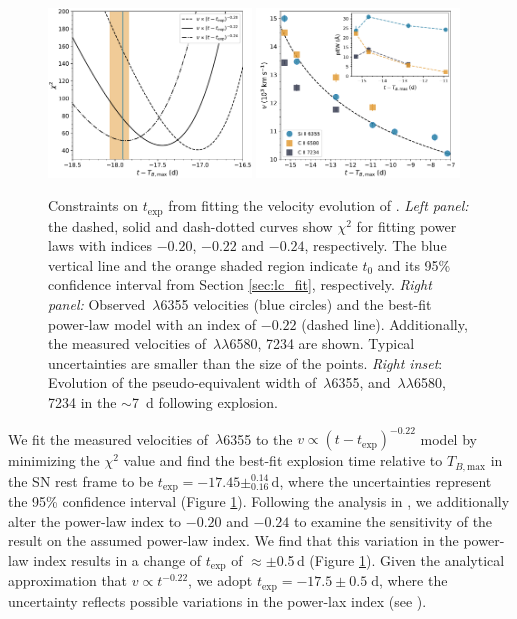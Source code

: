 \documentclass[twocolumn]{aastex61}
\begin{document}
\begin{figure}[!thb]
  \centering
  \includegraphics[width=0.48\textwidth]{Chi2.pdf}
  \includegraphics[width=0.48\textwidth]{VelocityPlot.pdf}
  \caption{Constraints on $t_\mathrm{exp}$ from fitting the velocity
    evolution of .
    \textit{Left panel:} the dashed, solid and dash-dotted curves 
    show $\chi^2$ for fitting power laws with
    indices $-0.20$, $-0.22$ and $-0.24$, respectively. The blue
    vertical line and the orange shaded region indicate $t_0$ and 
    its 95\% confidence interval from Section
    \ref{sec:lc_fit}, respectively.
    \textit{Right panel:} Observed \,$\lambda$6355
    velocities (blue circles) and the best-fit power-law model
     with an index of $-0.22$ (dashed line). Additionally, the 
     measured velocities of \,$\lambda\lambda$6580, 7234 
     are shown. Typical uncertainties are smaller than the size of 
     the points. \textit{Right inset}: Evolution of the 
     pseudo-equivalent width of \,$\lambda$6355, and 
     \,$\lambda\lambda$6580, 7234 in the $\sim$7~d    
     following explosion.}
  \label{fig:velocity_t_exp}
\end{figure}

We fit the measured velocities of \,$\lambda$6355 to the
$v\propto(t-t_\mathrm{exp})^{-0.22}$ model by minimizing the $\chi^2$ value and find the best-fit explosion time relative to $T_{B,\mathrm{max}}$ in the SN rest frame to be $t_\mathrm{exp} = -17.45 \pm ^{0.14}_{0.16}\,\textrm{d}$, where the uncertainties represent the 95\% confidence interval (Figure \ref{fig:velocity_t_exp}). Following the analysis in \citet{2014ApJ...784...85P}, we additionally alter the power-law index to $-0.20$ and $-0.24$ to examine the sensitivity of the result on the assumed power-law index. We find that this variation in the power-law index results in a change of $t_\mathrm{exp}$ of $\approx\pm$0.5\,d (Figure \ref{fig:velocity_t_exp}). Given the analytical approximation that $v \propto t^{-0.22}$, we adopt $t_\mathrm{exp} = -17.5 \pm 0.5 \; \mathrm{d}$, where the uncertainty reflects possible variations in the power-lax index (see \citealt{2014ApJ...784...85P}).
\end{document}
